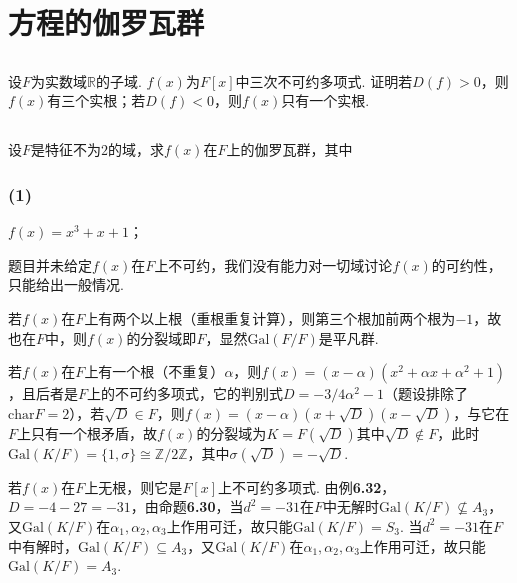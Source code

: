 \section{方程的伽罗瓦群}
\subsection{}
设$F$为实数域$\mathbb{R}$的子域. $f(x)$为$F[x]$中三次不可约多项式. 证明若$D(f)>0$，则$f(x)$有三个实根；若$D(f)<0$，则$f(x)$只有一个实根.


\subsection{}
设$F$是特征不为$2$的域，求$f(x)$在$F$上的伽罗瓦群，其中
\subsubsection{(1)}
$f(x)=x^3+x+1$；

\jie 题目并未给定$f(x)$在$F$上不可约，我们没有能力对一切域讨论$f(x)$的可约性，只能给出一般情况.

若$f(x)$在$F$上有两个以上根（重根重复计算），则第三个根加前两个根为$-1$，故也在$F$中，则$f(x)$的分裂域即$F$，显然$\mathrm{Gal}(F/F)$是平凡群.

若$f(x)$在$F$上有一个根（不重复）$\alpha$，则$f(x)=(x-\alpha)(x^2+\alpha x+\alpha^2+1)$，且后者是$F$上的不可约多项式，它的判别式$D=-3/4\alpha^2-1$（题设排除了$\mathrm{char}F=2$），若$\sqrt{D}\in F$，则$f(x)=(x-\alpha)(x+\sqrt{D})(x-\sqrt{D})$，与它在$F$上只有一个根矛盾，故$f(x)$的分裂域为$K=F(\sqrt{D})$其中$\sqrt{D}\notin F$，此时$\mathrm{Gal}(K/F)=\{1,\sigma\}\cong\mathbb{Z}/2\mathbb{Z}$，其中$\sigma(\sqrt{D})=-\sqrt{D}$.

若$f(x)$在$F$上无根，则它是$F[x]$上不可约多项式. 由{\heiti 例}\textbf{6.32}，$D=-4-27=-31$，由{\heiti 命题}\textbf{6.30}，当$d^2=-31$在$F$中无解时$\mathrm{Gal}(K/F)\nsubseteq A_3$，又$\mathrm{Gal}(K/F)$在$\alpha_1,\alpha_2,\alpha_3$上作用可迁，故只能$\mathrm{Gal}(K/F)=S_3$. 当$d^2=-31$在$F$中有解时，$\mathrm{Gal}(K/F)\subseteq A_3$，又$\mathrm{Gal}(K/F)$在$\alpha_1,\alpha_2,\alpha_3$上作用可迁，故只能$\mathrm{Gal}(K/F)=A_3$.

